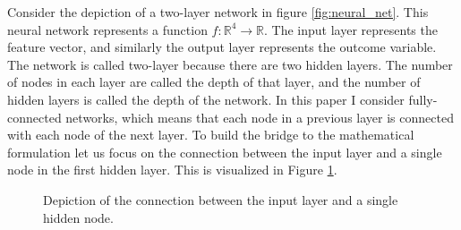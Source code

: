 Consider the depiction of a two-layer network in figure \ref{fig:neural_net}. This
neural network represents a function $f : \mathbb{R}^4 \to \mathbb{R}$. The input layer
represents the feature vector, and similarly the output layer represents the outcome
variable. The network is called two-layer because there are two hidden layers. The
number of nodes in each layer are called the depth of that layer, and the number of
hidden layers is called the depth of the network. In this paper I consider
fully-connected networks, which means that each node in a previous layer is connected
with each node of the next layer. To build the bridge to the mathematical formulation
let us focus on the connection between the input layer and a single node in the first
hidden layer. This is visualized in Figure \ref{fig:neural_net_single_connection}.

\begin{figure}[!ht]
\centering
{}

\caption{Depiction of the connection between the input layer and a single hidden node.}
\label{fig:neural_net_single_connection}
\end{figure}

